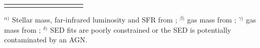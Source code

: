 \begin{table}
{\begin{tabular}{lcccccccccc}
	\hline\\[-6.0mm]
	\hline
	\label{tab:properties}
	\end{tabular}
	\begin{flushleft}                                      
    $^{\alpha)}$ Stellar mass, far-infrared luminosity and SFR from \cite{2015ApJ...806..110D}; $^{\beta)}$ gas mass from \cite{2018MNRAS.479.3879W}; $^{\gamma)}$ gas mass from  \cite{2018ApJ...863...56C}; $^{\delta)}$ SED fits are poorly constrained or the SED is potentially contaminated by an AGN.
    \end{flushleft} 
	}
\end{table}
